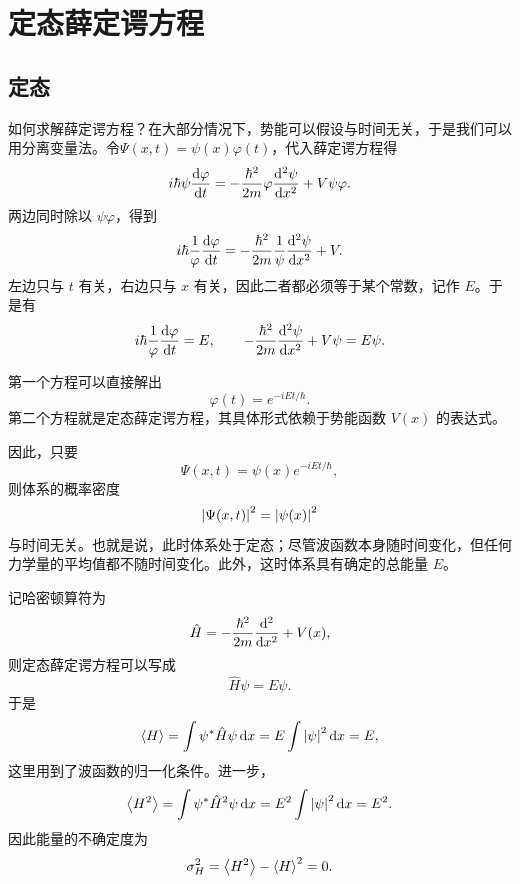 \newpage
\section{定态薛定谔方程}
\subsection{定态}
如何求解薛定谔方程？在大部分情况下，势能可以假设与时间无关，于是我们可以用分离变量法。令\(\Psi(x,t)=\psi(x)\varphi(t)\)，代入薛定谔方程得
\begin{equation}
    i\hbar \psi \dv{\varphi}{t}
    =
    -\frac{\hbar^2}{2m}\varphi \dv[2]{\psi}{x}
    +V\psi\varphi.
\end{equation}
两边同时除以 \(\psi\varphi\)，得到
\begin{equation}
    i\hbar \frac{1}{\varphi}\dv{\varphi}{t}
    =
    -\frac{\hbar^2}{2m}\frac{1}{\psi}\dv[2]{\psi}{x}+V.
\end{equation}
左边只与 \(t\) 有关，右边只与 \(x\) 有关，因此二者都必须等于某个常数，记作 \(E\)。于是有
\begin{equation}
    i\hbar \frac{1}{\varphi}\dv{\varphi}{t}=E,
    \qquad
    -\frac{\hbar^2}{2m}\dv[2]{\psi}{x}+V\psi=E\psi.
\end{equation}

第一个方程可以直接解出
\begin{equation}
    \varphi(t)=e^{-iEt/\hbar}.
\end{equation}
第二个方程就是定态薛定谔方程，其具体形式依赖于势能函数 \(V(x)\) 的表达式。

因此，只要
\begin{equation}
    \Psi(x,t)=\psi(x)e^{-iEt/\hbar},
\end{equation}
则体系的概率密度
\begin{equation}
    \abs{\Psi(x,t)}^2=\abs{\psi(x)}^2
\end{equation}
与时间无关。也就是说，此时体系处于定态；尽管波函数本身随时间变化，但任何力学量的平均值都不随时间变化。此外，这时体系具有确定的总能量 \(E\)。

记哈密顿算符为
\begin{equation}
    \hat{H}=-\frac{\hbar^2}{2m}\dv[2]{x}+V(x),
\end{equation}
则定态薛定谔方程可以写成
\begin{equation}
    \hat{H}\psi=E\psi.
\end{equation}
于是
\begin{equation}
    \ev{H}=\int \psi^*\hat{H}\psi\,\dd x
    =
    E\int \abs{\psi}^2\,\dd x
    =E,
\end{equation}
这里用到了波函数的归一化条件。进一步，
\begin{equation}
    \ev{H^2}=\int \psi^*\hat{H}^2\psi\,\dd x
    =
    E^2\int \abs{\psi}^2\,\dd x
    =E^2.
\end{equation}
因此能量的不确定度为
\begin{equation}
    \sigma_H^2=\ev{H^2}-\ev{H}^2=0.
\end{equation}

